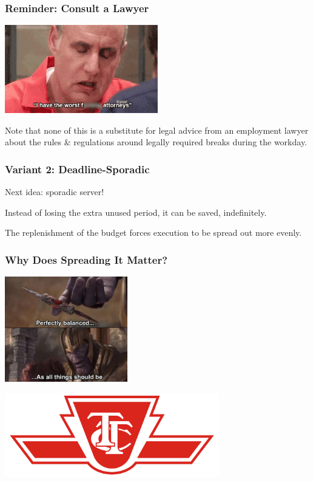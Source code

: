 \begin{frame}
\frametitle{Reminder: Consult a Lawyer}

\begin{center}
	\includegraphics[width=0.5\textwidth]{images/attorneys.jpg}
\end{center}

Note that none of this is a substitute for legal advice from an employment lawyer about the rules \& regulations around legally required breaks during the workday.

\end{frame}

\begin{frame}
\frametitle{Variant 2: Deadline-Sporadic}

Next idea: sporadic server!


Instead of losing the extra unused period, it can be saved, indefinitely. 

The replenishment of the budget forces execution to be spread out more evenly.

\end{frame}

\begin{frame}
\frametitle{Why Does Spreading It Matter?}

\begin{center}
	\includegraphics[width=0.4\textwidth]{images/balanced.jpg}
\end{center}

\begin{center}
	\includegraphics[width=0.7\textwidth]{images/ttc.png}
\end{center}

\end{frame}

